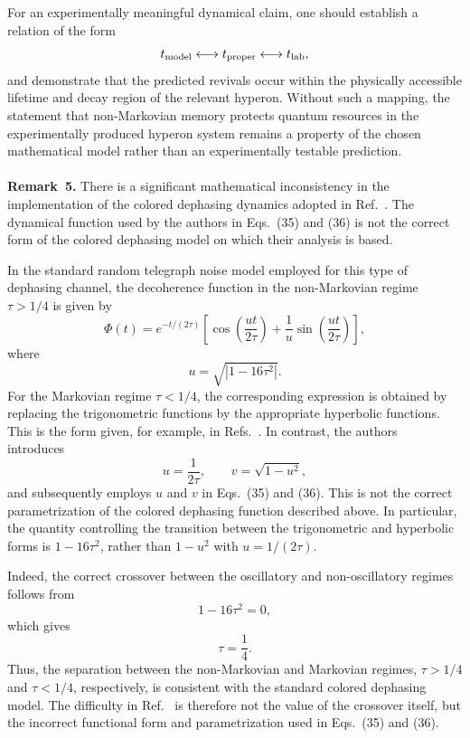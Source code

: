 \documentclass[epjc,twocolumn,nofootinbib,preprintnumbers,amsmath,amssymb]{revtex4-2}
\begin{document}
For an experimentally meaningful dynamical claim, one should establish a relation of the form
\begin{equation}
t_{\rm model}\longleftrightarrow t_{\rm proper}
\longleftrightarrow t_{\rm lab},
\end{equation}
and demonstrate that the predicted revivals occur within the physically accessible lifetime and decay region of the relevant hyperon.
Without such a mapping, the statement that non-Markovian memory protects quantum resources in the experimentally produced hyperon system remains a property of the chosen mathematical model rather than an experimentally testable prediction.
\\
\\
\textbf{Remark~5.}
There is a significant mathematical inconsistency in the implementation of the
colored dephasing dynamics adopted in Ref.~\cite{Bachain}. The dynamical function used by the authors in Eqs.~(35) and (36) is not the correct form of the colored dephasing model on which their analysis is based.

In the standard random telegraph noise model employed for this type of
dephasing channel, the decoherence function in the non-Markovian regime
$\tau>1/4$ is given by~\cite{HuZhou2019}
\begin{equation}
\Phi(t)=
e^{-t/(2\tau)}
\left[
\cos\left(\frac{ut}{2\tau}\right)
+
\frac{1}{u}
\sin\left(\frac{ut}{2\tau}\right)
\right],
\end{equation}
where
\begin{equation}
u=\sqrt{\left|1-16\tau^2\right|}.
\end{equation}
For the Markovian regime $\tau<1/4$, the corresponding expression is obtained
by replacing the trigonometric functions by the appropriate hyperbolic
functions. This is the form given, for example, in Refs.~\cite{HuZhou2019,Daffer2004}.
In contrast, the authors~\cite{Bachain} introduces
\begin{equation}
u=\frac{1}{2\tau},
\qquad
v=\sqrt{1-u^2},
\end{equation}
and subsequently employs $u$ and $v$ in Eqs.~(35) and (36). This is not the
correct parametrization of the colored dephasing function described above.
In particular, the quantity controlling the transition between the
trigonometric and hyperbolic forms is
$1-16\tau^2$,
rather than $1-u^2$ with $u=1/(2\tau)$.

Indeed, the correct crossover between the oscillatory and non-oscillatory
regimes follows from
\begin{equation}
1-16\tau^2=0,
\end{equation}
which gives
\begin{equation}
\tau=\frac14.
\end{equation}
Thus, the separation between the non-Markovian and Markovian regimes,
$\tau>1/4$ and $\tau<1/4$, respectively, is consistent with the standard
colored dephasing model. The difficulty in Ref.~\cite{Bachain} is therefore not the
value of the crossover itself, but the incorrect functional form and
parametrization used in Eqs.~(35) and (36).
\end{document}
